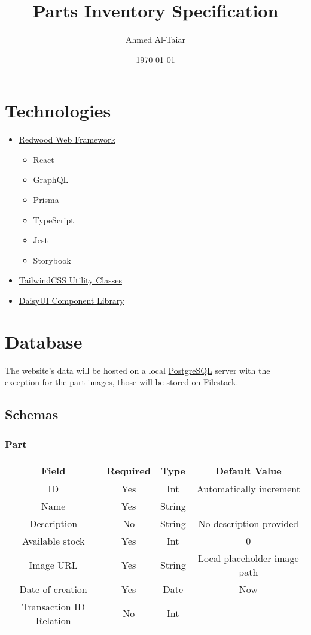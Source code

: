 \documentclass[12pt, letterpaper]{article}
\title{Parts Inventory Specification}
\author{Ahmed Al-Taiar}
\date{\today}
\begin{document}
\maketitle

\section{Technologies}

\begin{itemize}
    \item \href{https://redwoodjs.com/}{Redwood Web Framework}
    \begin{itemize}
        \item React
        \item GraphQL
        \item Prisma
        \item TypeScript
        \item Jest
        \item Storybook
    \end{itemize}
    \item \href{https://tailwindcss.com/}{TailwindCSS Utility Classes}
    \item \href{https://daisyui.com/}{DaisyUI Component Library}
\end{itemize}

\section{Database}

The website's data will be hosted on a local \href{https://www.postgresql.org/}{PostgreSQL} server with the exception for the part images, those will be stored on \href{https://www.filestack.com/}{Filestack}.

\subsection{Schemas}

\subsubsection{Part}

\begin{tabular}{cccc}
    \toprule
    \textbf{Field} & \textbf{Required} & \textbf{Type} & \textbf{Default Value} \\
    \midrule
    ID & Yes & Int & Automatically increment \\
    \midrule
    Name & Yes & String \\
    \midrule
    Description & No & String & No description provided \\
    \midrule
    Available stock & Yes & Int & 0 \\
    \midrule
    Image URL & Yes & String & Local placeholder image path \\
    \midrule
    Date of creation & Yes & Date & Now \\
    \midrule
    Transaction ID Relation & No & Int \\
    \bottomrule
\end{tabular}
\end{document}
